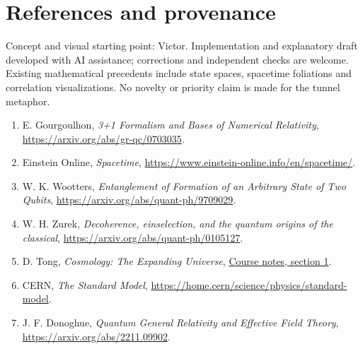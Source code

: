 \documentclass[11pt,a4paper]{article}
\begin{document}
\section*{References and provenance}
Concept and visual starting point: Victor. Implementation and explanatory draft developed with AI assistance; corrections and independent checks are welcome. Existing mathematical precedents include state spaces, spacetime foliations and correlation visualizations. No novelty or priority claim is made for the tunnel metaphor.
\begin{enumerate}
\item E. Gourgoulhon, \emph{3+1 Formalism and Bases of Numerical Relativity}, \url{https://arxiv.org/abs/gr-qc/0703035}.
\item Einstein Online, \emph{Spacetime}, \url{https://www.einstein-online.info/en/spacetime/}.
\item W. K. Wootters, \emph{Entanglement of Formation of an Arbitrary State of Two Qubits}, \url{https://arxiv.org/abs/quant-ph/9709029}.
\item W. H. Zurek, \emph{Decoherence, einselection, and the quantum origins of the classical}, \url{https://arxiv.org/abs/quant-ph/0105127}.
\item D. Tong, \emph{Cosmology: The Expanding Universe}, \href{https://davidtong.org/teaching/cosmology/cosmohtml/S1}{Course notes, section 1}.
\item CERN, \emph{The Standard Model}, \url{https://home.cern/science/physics/standard-model}.
\item J. F. Donoghue, \emph{Quantum General Relativity and Effective Field Theory}, \url{https://arxiv.org/abs/2211.09902}.
\end{enumerate}
\end{document}
